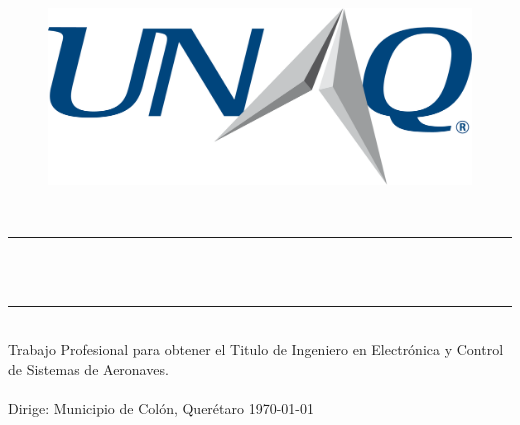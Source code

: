 %
\begin{titlepage}
	\begin{center}
		{\LARGE\thesisUniversityInstitute}\\[10mm]
		\begin{figure}[h]
			\centering
			\includegraphics[scale=0.5]{Contenido/Titulo/Logo.eps}
		\end{figure}
		\vspace{1cm}
		{\large \thesisSubject}\\[5mm]
		\rule{120mm}{0.5mm} \\[2mm]
		{\huge \thesisTitle}\\[2mm]
		\rule{120mm}{0.5mm} \\[10mm]
		\large Trabajo Profesional para obtener el Titulo de Ingeniero en Electrónica y Control de Sistemas de Aeronaves.
		\\
		\vspace{1cm}
		\Large \thesisName
		\\
		\vspace{1cm}
		\Large Dirige: \thesisFirstReviewer
		\vfill
		\Large Municipio de Colón, Querétaro \hfill \today
		
		
	\end{center}


\clearpage

\end{titlepage}


